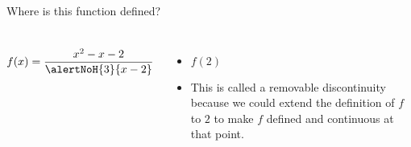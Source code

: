 \begin{frame}
\begin{example}
Where is this function defined?
\begin{columns}[c]
\[
f(x) = \frac{x^2 - x - 2}{\alertNoH{3}{x - 2}}
\]
\ 
\begin{itemize}
\item<2-| alert@2-3>  $f(2)$ 
\item<4->  This is called a removable discontinuity because we could extend the definition of $f$ to $2$ to make $f$ defined and continuous at that point.
\end{itemize}
\end{columns}
\end{example}
\end{frame}